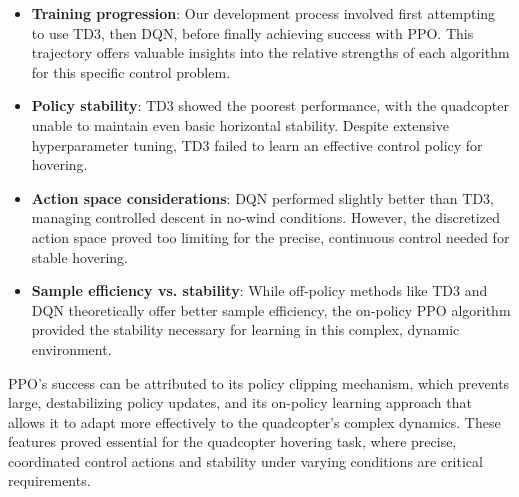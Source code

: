 \documentclass[12pt]{article}
\begin{document}
\begin{itemize}
    \item \textbf{Training progression}: Our development process involved first attempting to use TD3, then DQN, before finally achieving success with PPO. This trajectory offers valuable insights into the relative strengths of each algorithm for this specific control problem.
    
    \item \textbf{Policy stability}: TD3 showed the poorest performance, with the quadcopter unable to maintain even basic horizontal stability. Despite extensive hyperparameter tuning, TD3 failed to learn an effective control policy for hovering.
    
    \item \textbf{Action space considerations}: DQN performed slightly better than TD3, managing controlled descent in no-wind conditions. However, the discretized action space proved too limiting for the precise, continuous control needed for stable hovering.
    
    \item \textbf{Sample efficiency vs. stability}: While off-policy methods like TD3 and DQN theoretically offer better sample efficiency, the on-policy PPO algorithm provided the stability necessary for learning in this complex, dynamic environment.
\end{itemize}

%     
%     
%     

PPO's success can be attributed to its policy clipping mechanism, which prevents large, destabilizing policy updates, and its on-policy learning approach that allows it to adapt more effectively to the quadcopter's complex dynamics. These features proved essential for the quadcopter hovering task, where precise, coordinated control actions and stability under varying conditions are critical requirements.
\end{document}
